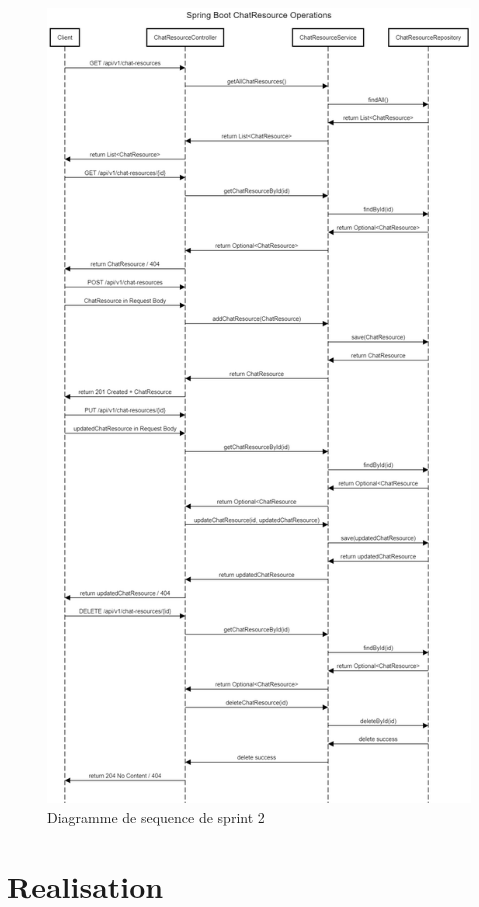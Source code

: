 \documentclass[a4paper, 11pt, openany]{report}
\begin{document}
\begin{figure}[H]
\centering
\includegraphics[width=\textwidth]{assets/images/chat-res-seq.png} 
\caption{Diagramme de sequence de sprint 2}
\label{fig:chatres_seq}
\end{figure}

\section{Realisation}
\end{document}

